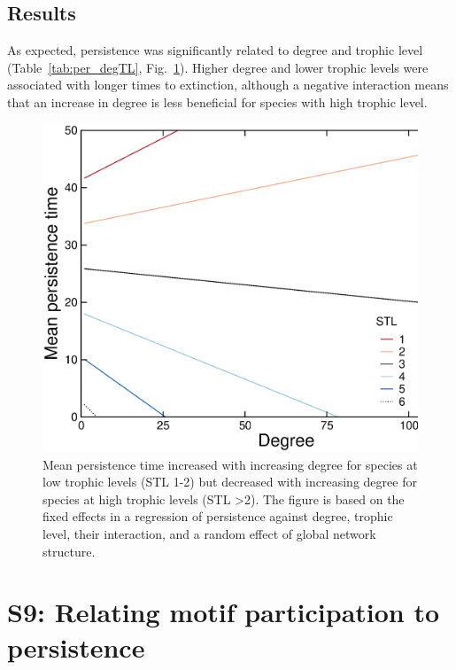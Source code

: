 \documentclass[12pt]{article}
\begin{document}
	\subsection*{Results}

		As expected, persistence was significantly related to degree and trophic level (Table~\ref{tab:per_degTL}, Fig.~\ref{fig:persistence_degTL}).
		Higher degree and lower trophic levels were associated with longer times to extinction, although a negative interaction means that an increase in degree is less beneficial for species with high trophic level.


	    \begin{figure}[hb!]
	        \centering
	        \includegraphics[width=.75\textwidth]{figures/roles/persistence_vs_degTL.eps}
	        \caption{Mean persistence time increased with increasing degree for species at low trophic levels (STL 1-2) but decreased with increasing degree for species at high trophic levels (STL \textgreater2). The figure is based on the fixed effects in a regression of persistence against degree, trophic level, their interaction, and a random effect of global network structure.}
	        \label{fig:persistence_degTL}
	    \end{figure}


\clearpage


\section*{S9: Relating motif participation to persistence}
\end{document}
